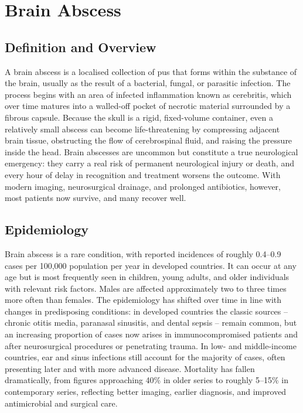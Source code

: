 \chapter{Brain Abscess}

\section*{Definition and Overview}
A brain abscess is a localised collection of pus that forms within the substance of the brain, usually as the result of a bacterial, fungal, or parasitic infection. The process begins with an area of infected inflammation known as cerebritis, which over time matures into a walled-off pocket of necrotic material surrounded by a fibrous capsule. Because the skull is a rigid, fixed-volume container, even a relatively small abscess can become life-threatening by compressing adjacent brain tissue, obstructing the flow of cerebrospinal fluid, and raising the pressure inside the head. Brain abscesses are uncommon but constitute a true neurological emergency: they carry a real risk of permanent neurological injury or death, and every hour of delay in recognition and treatment worsens the outcome. With modern imaging, neurosurgical drainage, and prolonged antibiotics, however, most patients now survive, and many recover well.

\section*{Epidemiology}
Brain abscess is a rare condition, with reported incidences of roughly 0.4--0.9 cases per 100,000 population per year in developed countries. It can occur at any age but is most frequently seen in children, young adults, and older individuals with relevant risk factors. Males are affected approximately two to three times more often than females. The epidemiology has shifted over time in line with changes in predisposing conditions: in developed countries the classic sources -- chronic otitis media, paranasal sinusitis, and dental sepsis -- remain common, but an increasing proportion of cases now arises in immunocompromised patients and after neurosurgical procedures or penetrating trauma. In low- and middle-income countries, ear and sinus infections still account for the majority of cases, often presenting later and with more advanced disease. Mortality has fallen dramatically, from figures approaching 40\% in older series to roughly 5--15\% in contemporary series, reflecting better imaging, earlier diagnosis, and improved antimicrobial and surgical care.

